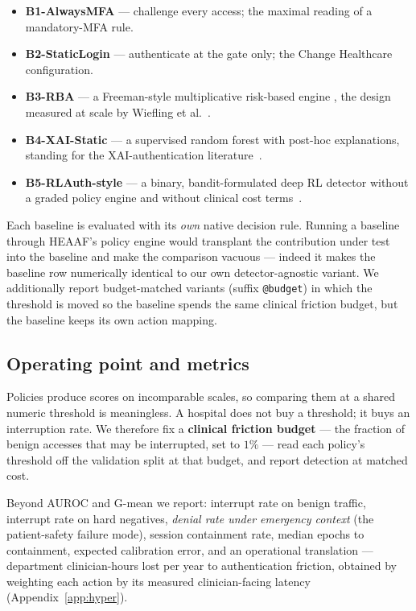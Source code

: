 \documentclass[conference]{IEEEtran}
\begin{document}
\begin{itemize}
\item \textbf{B1-AlwaysMFA} --- challenge every access; the maximal reading of
a mandatory-MFA rule.
\item \textbf{B2-StaticLogin} --- authenticate at the gate only; the Change
Healthcare configuration.
\item \textbf{B3-RBA} --- a Freeman-style multiplicative risk-based engine
\cite{freeman2016}, the design measured at scale by
Wiefling et al.~\cite{wiefling2022}.
\item \textbf{B4-XAI-Static} --- a supervised random forest with post-hoc
explanations, standing for the XAI-authentication
literature~\cite{raouf2024,nizam2026}.
\item \textbf{B5-RLAuth-style} --- a binary, bandit-formulated deep RL detector
without a graded policy engine and without clinical cost
terms~\cite{rlauth}.
\end{itemize}

Each baseline is evaluated with its \emph{own} native decision rule. Running a
baseline through HEAAF's policy engine would transplant the contribution under
test into the baseline and make the comparison vacuous --- indeed it makes the
baseline row numerically identical to our own detector-agnostic variant. We
additionally report budget-matched variants (suffix \texttt{@budget}) in which
the threshold is moved so the baseline spends the same clinical friction
budget, but the baseline keeps its own action mapping.

\subsection{Operating point and metrics}

Policies produce scores on incomparable scales, so comparing them at a shared
numeric threshold is meaningless. A hospital does not buy a threshold; it buys
an interruption rate. We therefore fix a \textbf{clinical friction budget} ---
the fraction of benign accesses that may be interrupted, set to $1\%$ --- read
each policy's threshold off the validation split at that budget, and report
detection at matched cost.

Beyond AUROC and G-mean we report: interrupt rate on benign traffic, interrupt
rate on hard negatives, \emph{denial rate under emergency context} (the
patient-safety failure mode), session containment rate, median epochs to
containment, expected calibration error, and an operational translation ---
department clinician-hours lost per year to authentication friction, obtained
by weighting each action by its measured clinician-facing latency
(Appendix~\ref{app:hyper}).
\end{document}
